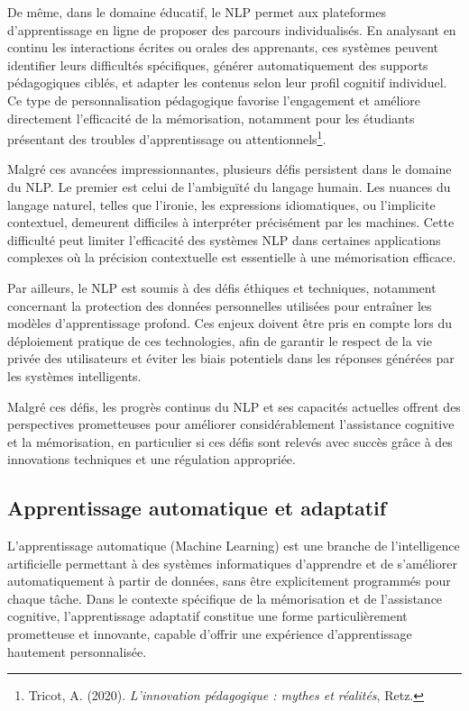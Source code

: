\documentclass[11pt,a4paper]{report}
\begin{document}
De même, dans le domaine éducatif, le NLP permet aux plateformes d’apprentissage en ligne de proposer des parcours individualisés. En analysant en continu les interactions écrites ou orales des apprenants, ces systèmes peuvent identifier leurs difficultés spécifiques, générer automatiquement des supports pédagogiques ciblés, et adapter les contenus selon leur profil cognitif individuel. Ce type de personnalisation pédagogique favorise l'engagement et améliore directement l'efficacité de la mémorisation, notamment pour les étudiants présentant des troubles d’apprentissage ou attentionnels\footnote{Tricot, A. (2020). \textit{L'innovation pédagogique : mythes et réalités}, Retz.}.

Malgré ces avancées impressionnantes, plusieurs défis persistent dans le domaine du NLP. Le premier est celui de l'ambiguïté du langage humain. Les nuances du langage naturel, telles que l’ironie, les expressions idiomatiques, ou l'implicite contextuel, demeurent difficiles à interpréter précisément par les machines. Cette difficulté peut limiter l’efficacité des systèmes NLP dans certaines applications complexes où la précision contextuelle est essentielle à une mémorisation efficace.

Par ailleurs, le NLP est soumis à des défis éthiques et techniques, notamment concernant la protection des données personnelles utilisées pour entraîner les modèles d’apprentissage profond. Ces enjeux doivent être pris en compte lors du déploiement pratique de ces technologies, afin de garantir le respect de la vie privée des utilisateurs et éviter les biais potentiels dans les réponses générées par les systèmes intelligents.

Malgré ces défis, les progrès continus du NLP et ses capacités actuelles offrent des perspectives prometteuses pour améliorer considérablement l’assistance cognitive et la mémorisation, en particulier si ces défis sont relevés avec succès grâce à des innovations techniques et une régulation appropriée.

\subsection{Apprentissage automatique et adaptatif}

L'apprentissage automatique (Machine Learning) est une branche de l’intelligence artificielle permettant à des systèmes informatiques d’apprendre et de s'améliorer automatiquement à partir de données, sans être explicitement programmés pour chaque tâche. Dans le contexte spécifique de la mémorisation et de l’assistance cognitive, l'apprentissage adaptatif constitue une forme particulièrement prometteuse et innovante, capable d’offrir une expérience d’apprentissage hautement personnalisée.
\end{document}
